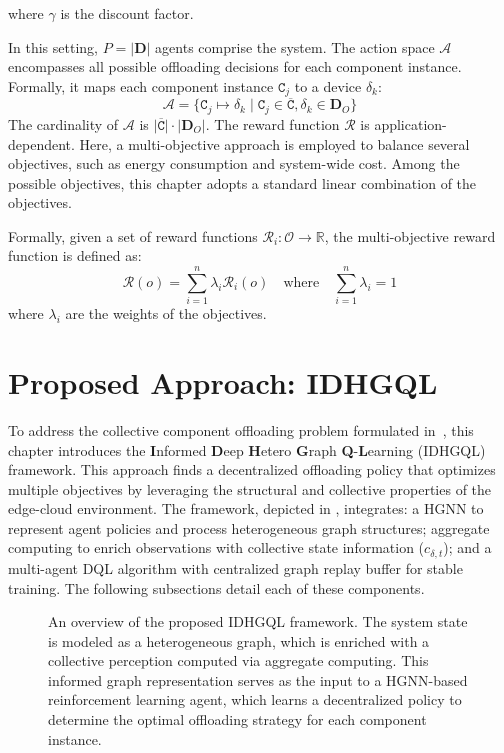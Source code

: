 where $\gamma$ is the discount factor.

In this setting, $P = |\mathbf{D}|$ agents comprise the system.  
%
The action space $\mathcal{A}$ encompasses all possible offloading decisions for each component instance.
Formally, 
 it maps each component instance $\mathtt{C}_j$ to a device $\delta_k$:
$$
\mathcal{A} = \{ \mathtt{C}_j \mapsto \delta_k \mid \mathtt{C}_j \in \overline{\mathtt{C}}, \delta_k \in \mathbf{D}_O \}
$$
The cardinality of $\mathcal{A}$ is $\lvert\overline{\mathtt{C}}\rvert \cdot \lvert\mathbf{D}_O\rvert$.
%
The reward function $\mathcal{R}$ is application-dependent.
%
Here, 
 a multi-objective approach is employed 
 to balance several objectives, such as energy consumption and system-wide cost.
%
Among the possible objectives, 
 this chapter adopts a standard linear combination of the objectives.

Formally, 
 given a set of reward functions $\mathcal{R}_i: \mathcal{O} \to \mathbb{R}$, 
 the multi-objective reward function is defined as:
$$
\mathcal{R}(o) = \sum_{i=1}^n \lambda_i \mathcal{R}_i(o) \quad \text{where} \quad \sum_{i=1}^n \lambda_i = 1
$$
where $\lambda_i$ are the weights of the objectives.

\section{Proposed Approach: IDHGQL}\label{sec:methodology}
To address the collective component offloading problem formulated in~, 
 this chapter introduces the \textbf{I}nformed \textbf{D}eep \textbf{H}etero \textbf{G}raph \textbf{Q}-\textbf{L}earning (IDHGQL) framework. 
 This approach finds a decentralized offloading policy that optimizes multiple objectives 
 by leveraging the structural and collective properties of the edge-cloud environment.
%
The framework, depicted in , integrates:
 a \gls{HGNN} to represent agent policies and process heterogeneous graph structures;
 aggregate computing to enrich observations with collective state information ($c_{\delta,t}$); 
 and a multi-agent \gls{DQL} algorithm with centralized graph replay buffer for stable training.
%
The following subsections detail each of these components.

\begin{figure}
  \centering
  \resizebox{\linewidth}{!}{%
  }
  \caption{
    An overview of the proposed IDHGQL framework.
    The system state is modeled as a heterogeneous graph,
    which is enriched with a collective perception computed via aggregate computing.
    This informed graph representation serves as the input to a
    \gls{HGNN}-based reinforcement learning agent,
    which learns a decentralized policy to determine the optimal offloading
    strategy for each component instance.
  }
  \label{fig:gnn-ac-marl}
\end{figure}

